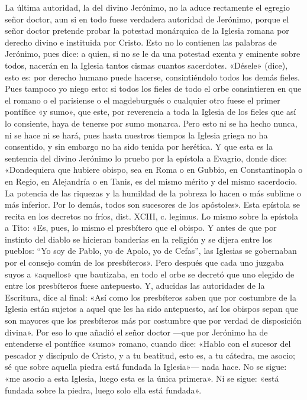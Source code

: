La última autoridad, la del divino Jerónimo, no la aduce rectamente el egregio señor doctor, aun si en todo fuese verdadera autoridad de Jerónimo, porque el señor doctor pretende probar la potestad monárquica de la Iglesia romana por derecho divino e instituida por Cristo. Esto no lo contienen las palabras de Jerónimo, pues dice: a quien, si no se le da una potestad exenta y eminente sobre todos, nacerán en la Iglesia tantos cismas cuantos sacerdotes. «Désele» (dice), esto es: por derecho humano puede hacerse, consintiéndolo todos los demás fieles. Pues tampoco yo niego esto: si todos los fieles de todo el orbe consintieren en que el romano o el parisiense o el magdeburgués o cualquier otro \marginpar{\small[259]} fuese el primer pontífice «y sumo», que este, por reverencia a toda la Iglesia de los fieles que así lo consiente, haya de tenerse por sumo monarca. Pero esto ni se ha hecho nunca, ni se hace ni se hará, pues hasta nuestros tiempos la Iglesia griega no ha consentido, y sin embargo no ha sido tenida por herética. Y que esta es la sentencia del divino Jerónimo lo pruebo por la epístola a Evagrio, donde dice: «Dondequiera que hubiere obispo, sea en Roma o en Gubbio, en Constantinopla o en Regio, en Alejandría o en Tanis, es del mismo mérito y del mismo sacerdocio. La potencia de las riquezas y la humildad de la pobreza lo hacen o más sublime o más inferior. Por lo demás, todos son sucesores de los apóstoles». Esta epístola se recita en los decretos no fríos, dist. XCIII, c. legimus. Lo mismo sobre la epístola a Tito: «Es, pues, lo mismo el presbítero que el obispo. Y antes de que por instinto del diablo se hicieran banderías en la religión y se dijera entre los pueblos: “Yo soy de Pablo, yo de Apolo, yo de Cefas”, las Iglesias se gobernaban por el consejo común de los presbíteros». Pero después que cada uno juzgaba suyos a «aquellos» que bautizaba, en todo el orbe se decretó que uno elegido de entre los presbíteros fuese antepuesto. Y, aducidas las autoridades de la Escritura, dice al final: «Así como los presbíteros saben que por costumbre de la Iglesia están sujetos a aquel que les ha sido antepuesto, así los obispos sepan que son mayores que los presbíteros más por costumbre que por verdad de disposición divina». Por eso lo que añadió el señor doctor —que por Jerónimo ha de entenderse el pontífice «sumo» romano, cuando dice: «Hablo con el sucesor del pescador y discípulo de Cristo, y a tu beatitud, esto es, a tu cátedra, me asocio; sé que sobre aquella piedra está fundada la Iglesia»— nada hace. No se sigue: «me asocio a esta Iglesia, luego esta es la única primera». Ni se sigue: «está fundada sobre la piedra, luego solo ella está fundada».

